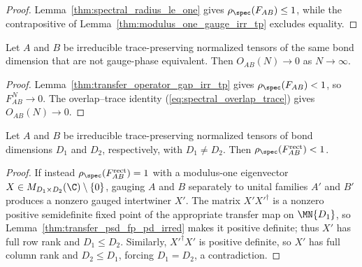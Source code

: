 \begin{proof}\leanok
    Lemma~\ref{thm:spectral_radius_le_one} gives
    $\rho_{\spec}(F_{AB})\leq1$, while the contrapositive of
    Lemma~\ref{thm:modulus_one_gauge_irr_tp} excludes equality.
\end{proof}

\begin{lemma}%
    \label{thm:overlap_decay_irr_tp}
    \leanok
    Let $A$ and $B$ be irreducible trace-preserving normalized tensors of
    the same bond dimension that are not gauge-phase equivalent. Then
    $O_{AB}(N)\to0$ as $N\to\infty$.
\end{lemma}

\begin{proof}\leanok
    Lemma~\ref{thm:transfer_operator_gap_irr_tp} gives
    $\rho_{\spec}(F_{AB})<1$, so $F_{AB}^N\to0$. The overlap--trace identity
    (\ref{eq:spectral_overlap_trace}) gives $O_{AB}(N)\to0$.
\end{proof}

\begin{lemma}%
    \label{thm:transfer_operator_gap_rect_irr_tp}
    \leanok
    Let $A$ and $B$ be irreducible trace-preserving normalized tensors of
    bond dimensions $D_1$ and $D_2$, respectively, with $D_1\neq D_2$.
    Then $\rho_{\spec}(F_{AB}^{\mathrm{rect}})<1$.
\end{lemma}

\begin{proof}
    \leanok
    If instead $\rho_{\spec}(F_{AB}^{\mathrm{rect}})=1$ with a modulus-one
    eigenvector $X\in M_{D_1\times D_2}(\C)\setminus\{0\}$, gauging $A$ and
    $B$ separately to unital families $A'$ and $B'$ produces a nonzero gauged
    intertwiner $X'$. The matrix $X'X'^\dagger$ is a nonzero positive
    semidefinite fixed point of the appropriate transfer map on $\MN{D_1}$, so
    Lemma~\ref{thm:transfer_psd_fp_pd_irred} makes it positive definite; thus
    $X'$ has full row rank and $D_1\leq D_2$. Similarly, $X'^\dagger X'$ is
    positive definite, so $X'$ has full column rank and $D_2\leq D_1$,
    forcing $D_1=D_2$, a contradiction.
\end{proof}

